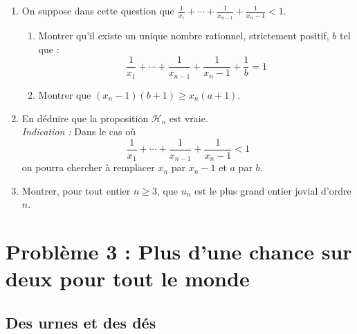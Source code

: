 \documentclass[landscape,twocolumn,leqno,a4paper,10pt]{report} %
\renewcommand{\geq}{\geqslant}
\renewcommand{\leq}{\leqslant}
\begin{document}
\begin{enumerate}
\begin{enumerate}
		\item En déduire que $a+1 \leq v_{n+1}$ et $x_{1} \cdots x_{n}(a+1) \leq v_{1} \cdots v_{n} v_{n+1}$.
	\end{enumerate}
	\item On suppose dans cette question que $\frac{1}{x_{1}}+\cdots+\frac{1}{x_{n-1}}+\frac{1}{x_{n}-1}<1$.
	\begin{enumerate}
		\item Montrer qu'il existe un unique nombre rationnel, strictement positif, $b$ tel que :
		$$\frac{1}{x_{1}}+\cdots+\frac{1}{x_{n-1}}+\frac{1}{x_{n}-1}+\frac{1}{b}=1$$
		\item Montrer que $\left(x_{n}-1\right)(b+1) \geq x_{n}(a+1)$.
	\end{enumerate}
	\item En déduire que la proposition $\mathscr{H}_{n}$ est vraie.\\
	\textit{Indication :} Dans le cas où 
	$$\frac{1}{x_{1}}+\cdots+\frac{1}{x_{n-1}}+\frac{1}{x_{n}-1}<1$$
	on pourra chercher à remplacer $x_{n}$ par $x_{n}-1$ et $a$ par $b$.
	\item Montrer, pour tout entier $n \geq 3$, que $u_{n}$ est le plus grand entier jovial d'ordre $n$.
\end{enumerate}


\section{Problème 3 : Plus d'une chance sur deux pour tout le monde}

\subsection{Des urnes et des dés}
\end{document}

